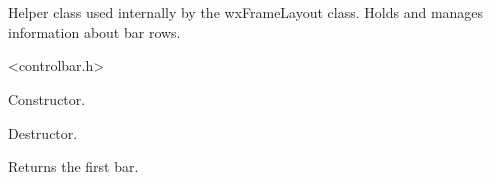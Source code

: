 %
%


\section{}\label{cbrowinfo}


Helper class used internally by the wxFrameLayout class.
Holds and manages information about bar rows.




<controlbar.h>




\label{cbrowinfocbrowinfo}


Constructor.


\label{cbrowinfodtor}


Destructor.


\label{cbrowinfogetfirstbar}


Returns the first bar.

